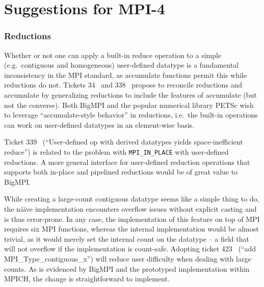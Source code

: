 
\section{Suggestions for MPI-4}

\subsubsection{Reductions}

Whether or not one can apply a built-in reduce operation to a simple 
(e.g.\ contiguous and homogeneous) user-defined datatype
is a fundamental inconsistency in the MPI standard, as accumulate
functions permit this while reductions do not.
Tickets 34~\cite{ticket34} and 338~\cite{ticket338}
propose to reconcile reductions and accumulate by generalizing
reductions to include the features of accumulate (but not the converse).
Both BigMPI and the popular numerical library PETSc wish to leverage 
``accumulate-style behavior'' in reductions, i.e.\  the built-in operations 
can work on user-defined datatypes in an element-wise basis.

Ticket 339~\cite{ticket339} %
(``User-defined op with derived datatypes yields space-inefficient reduce'')
is related to the problem with \texttt{MPI\_IN\_PLACE} with user-defined reductions.
A more general interface for user-defined reduction operations that supports both
in-place and pipelined reductions would be of great value to BigMPI.

While creating a large-count contiguous datatype seems like a simple thing to do,
the n{\"a}ive implementation encounters overflow issues without explicit casting and is
thus error-prone.  In any case, the implementation of this feature on top of MPI
requires six MPI functions, whereas the internal implementation would be almost trivial,
as it would merely set the internal count on the datatype -- a field that will not overflow 
if the implementation is count-safe.
Adopting ticket 423~\cite{ticket423} %
(``add MPI\_Type\_contiguous\_x'') will reduce user difficulty when dealing with large counts.
As is evidenced by BigMPI and the prototyped implementation within MPICH, 
the change is straightforward to implement.

